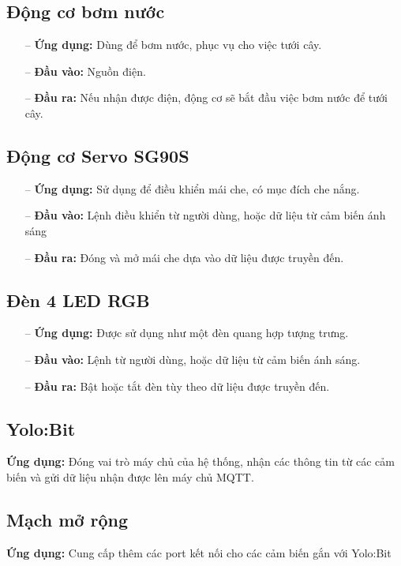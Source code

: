 \subsection{Động cơ bơm nước}
\begin{itemize}
    \item [--] \textbf{Ứng dụng:} Dùng để bơm nước, phục vụ cho việc tưới cây.
    \item [--] \textbf{Đầu vào:} Nguồn điện.
    \item [--] \textbf{Đầu ra:} Nếu nhận được điện, động cơ sẽ bắt đầu việc bơm nước để tưới cây.
\end{itemize}

\subsection{Động cơ Servo SG90S}
\begin{itemize}
    \item [--] \textbf{Ứng dụng:} Sử dụng để điều khiển mái che, có mục đích che nắng.
    \item [--] \textbf{Đầu vào:} Lệnh điều khiển từ người dùng, hoặc dữ liệu từ cảm biến ánh sáng
    \item [--] \textbf{Đầu ra:} Đóng và mở mái che dựa vào dữ liệu được truyền đến.
\end{itemize}

\subsection{Đèn 4 LED RGB}
\begin{itemize}
    \item [--] \textbf{Ứng dụng:} Được sử dụng như một đèn quang hợp tượng trưng.
    \item [--] \textbf{Đầu vào:} Lệnh từ người dùng, hoặc dữ liệu từ cảm biến ánh sáng.
    \item [--] \textbf{Đầu ra:} Bật hoặc tắt đèn tùy theo dữ liệu được truyền đến.
\end{itemize}

\subsection{Yolo:Bit}
\textbf{Ứng dụng:} Đóng vai trò máy chủ của hệ thống, nhận các thông tin từ các cảm biến và gửi dữ liệu nhận được lên máy chủ MQTT.

\subsection{Mạch mở rộng}
\textbf{Ứng dụng:} Cung cấp thêm các port kết nối cho các cảm biến gắn với Yolo:Bit

\newpage
